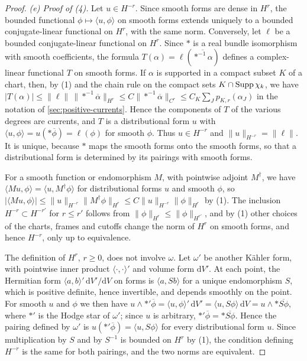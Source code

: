 \begin{proof}
\emph{(e) Proof of (4).} Let $u\in H^{-r}$. Since smooth forms are dense in $H^r$, the bounded functional $\phi\mapsto\langle u,\phi\rangle$ on smooth forms extends uniquely to a bounded conjugate-linear functional on $H^r$, with the same norm. Conversely, let $\ell$ be a bounded conjugate-linear functional on $H^r$. Since $*$ is a real bundle isomorphism with smooth coefficients, the formula $T(\alpha)=\ell(\overline{*^{-1}\alpha})$ defines a complex-linear functional $T$ on smooth forms. If $\alpha$ is supported in a compact subset $K$ of a chart, then, by (1) and the chain rule on the compact sets $K\cap\operatorname{Supp}\chi_k$, we have $|T(\alpha)|\leq\|\ell\|\,\|*^{-1}\overline\alpha\|_{H^r}\leq C\|*^{-1}\overline\alpha\|_{C^r}\leq C_K\sum_Jp_{K,r}(\alpha_J)$ in the notation of \cref{sec:positive-currents}. Hence the components of $T$ of the various degrees are currents, and $T$ is a distributional form $u$ with $\langle u,\phi\rangle=u(*\overline\phi)=\ell(\phi)$ for smooth $\phi$. Thus $u\in H^{-r}$ and $\|u\|_{H^{-r}}=\|\ell\|$. It is unique, because $*$ maps the smooth forms onto the smooth forms, so that a distributional form is determined by its pairings with smooth forms.

For a smooth function or endomorphism $M$, with pointwise adjoint $M^\dagger$, we have $\langle Mu,\phi\rangle=\langle u,M^\dagger\phi\rangle$ for distributional forms $u$ and smooth $\phi$, so $|\langle Mu,\phi\rangle|\leq\|u\|_{H^{-r}}\|M^\dagger\phi\|_{H^r}\leq C\|u\|_{H^{-r}}\|\phi\|_{H^r}$ by (1). The inclusion $H^{-r}\subset H^{-r'}$ for $r\leq r'$ follows from $\|\phi\|_{H^r}\leq\|\phi\|_{H^{r'}}$, and by (1) other choices of the charts, frames and cutoffs change the norm of $H^r$ on smooth forms, and hence $H^{-r}$, only up to equivalence.

The definition of $H^r$, $r\geq0$, does not involve $\omega$. Let $\omega'$ be another K\"ahler form, with pointwise inner product $\langle\cdot,\cdot\rangle'$ and volume form $\mathrm dV'$. At each point, the Hermitian form $\langle a,b\rangle'\,\mathrm dV'/\mathrm dV$ on forms is $\langle a,Sb\rangle$ for a unique endomorphism $S$, which is positive definite, hence invertible, and depends smoothly on the point. For smooth $u$ and $\phi$ we then have $u\wedge*'\overline\phi=\langle u,\phi\rangle'\,\mathrm dV'=\langle u,S\phi\rangle\,\mathrm dV=u\wedge*\overline{S\phi}$, where $*'$ is the Hodge star of $\omega'$; since $u$ is arbitrary, $*'\overline\phi=*\overline{S\phi}$. Hence the pairing defined by $\omega'$ is $u(*'\overline\phi)=\langle u,S\phi\rangle$ for every distributional form $u$. Since multiplication by $S$ and by $S^{-1}$ is bounded on $H^r$ by (1), the condition defining $H^{-r}$ is the same for both pairings, and the two norms are equivalent.


\end{proof}
